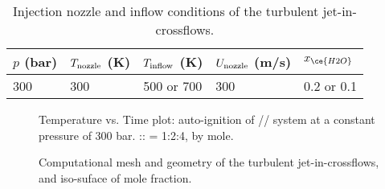\begin{table}[htb]

    
    \begin{minipage}{0.9\textwidth}
        \caption{Injection nozzle and inflow conditions of the turbulent jet-in-crossflows.}    \label{JICFconditions}

        \begin{center}
            \begin{tabular}{@{}lllll@{}}%
                \toprule
                $p$ (bar) & $T_{\rm{nozzle}}$ (K) & $T_{\rm{inflow}}$ (K) & $U_{\rm{nozzle}}$ (m/s) & $x_{\ce{H2O}}$ \\ %
                \midrule
                300       & 300                   & 500 or 700            & 300                     & 0.2 or 0.1     \\%
                \bottomrule
            \end{tabular}
        \end{center}
    \end{minipage}

\end{table}
\begin{figure}[htb]
    \centering
    \caption{Temperature vs. Time plot: auto-ignition of // system at a constant pressure of 300 bar. :: = 1:2:4, by mole.}
    \label{JICFautoig}
\end{figure}
\begin{figure}[htb]
    \centering
    \caption{Computational mesh and geometry of the turbulent jet-in-crossflows, and iso-suface of  mole fraction.}
    \label{JICFg}
\end{figure}

